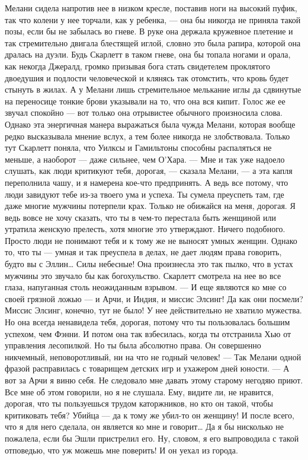 Мелани сидела напротив нее в низком кресле, поставив ноги на высокий пуфик, так что колени у нее торчали, как у ребенка, — она бы никогда не приняла такой позы, если бы не забылась во гневе. В руке она держала кружевное плетение и так стремительно двигала блестящей иглой, словно это была рапира, которой она дралась на дуэли.
Будь Скарлетт в таком гневе, она бы топала ногами и орала, как некогда Джералд, громко призывая бога стать свидетелем проклятого двоедушия и подлости человеческой и клянясь так отомстить, что кровь будет стынуть в жилах. А у Мелани лишь стремительное мелькание иглы да сдвинутые на переносице тонкие брови указывали на то, что она вся кипит. Голос же ее звучал спокойно — вот только она отрывистее обычного произносила слова. Однако эта энергичная манера выражаться была чужда Мелани, которая вообще редко высказывала мнение вслух, а тем более никогда не злобствовала. Только тут Скарлетт поняла, что Уилксы и Гамильтоны способны распаляться не меньше, а наоборот — даже сильнее, чем О’Хара.
— Мне и так уже надоело слушать, как люди критикуют тебя, дорогая, — сказала Мелани, — а эта капля переполнила чашу, и я намерена кое-что предпринять. А ведь все потому, что люди завидуют тебе из-за твоего ума и успеха. Ты сумела преуспеть там, где даже многие мужчины потерпели крах. Только не обижайся на меня, дорогая. Я ведь вовсе не хочу сказать, что ты в чем-то перестала быть женщиной или утратила женскую прелесть, хотя многие это утверждают. Ничего подобного. Просто люди не понимают тебя и к тому же не выносят умных женщин. Однако то, что ты — умная и так преуспела в делах, не дает людям права говорить, будто вы с Эллин… Силы небесные!
Она произнесла это так пылко, что в устах мужчины это звучало бы как богохульство. Скарлетт смотрела на нее во все глаза, напуганная столь неожиданным взрывом.
— И еще являются ко мне со своей грязной ложью — и Арчи, и Индия, и миссис Элсинг! Да как они посмели? Миссис Элсинг, конечно, тут не было! У нее действительно не хватило мужества.
Но она всегда ненавидела тебя, дорогая, потому что ты пользовалась большим успехом, чем Фэнни. И потом она так взбесилась, когда ты отстранила Хью от управления лесопилкой. Но ты была абсолютно права. Он совершенно никчемный, неповоротливый, ни на что не годный человек! — Так Мелани одной фразой расправилась с товарищем детских игр и ухажером дней юности. — А вот за Арчи я виню себя. Не следовало мне давать этому старому негодяю приют. Все мне об этом говорили, но я не слушала. Ему, видите ли, не нравится, дорогая, что ты пользуешься трудом каторжников, но кто он такой, чтобы критиковать тебя? Убийца — да к тому же убил-то он женщину! И после всего, что я для него сделала, он является ко мне и говорит… Да я бы нисколько не пожалела, если бы Эшли пристрелил его. Ну, словом, я его выпроводила с такой отповедью, что уж можешь мне поверить! И он уехал из города.
